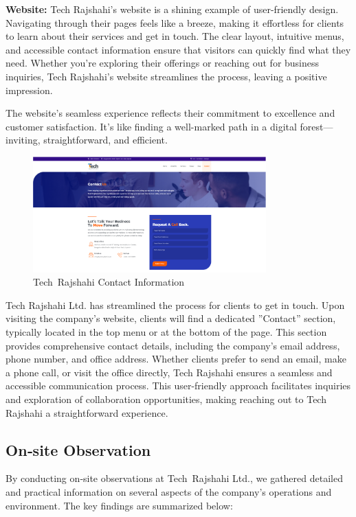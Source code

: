 \documentclass[12pt,a4paper]{article}
\begin{document}
\textbf{Website:} Tech Rajshahi’s website is a shining example of user-friendly design. Navigating through their pages feels like a breeze, making it effortless for clients to learn about their services and get in touch. The clear layout, intuitive menus, and accessible contact information ensure that visitors can quickly find what they need. Whether you’re exploring their offerings or reaching out for business inquiries, Tech Rajshahi’s website streamlines the process, leaving a positive impression. 

The website’s seamless experience reflects their commitment to excellence and customer satisfaction. It’s like finding a well-marked path in a digital forest—inviting, straightforward, and efficient.

\begin{figure}[H]
    \centering
    \includegraphics[width=0.8\textwidth]{Fig/tech_contact.png}
    \caption{Tech Rajshahi Contact Information}
    \label{fig:tech_contact}
\end{figure}

Tech Rajshahi Ltd. has streamlined the process for clients to get in touch. Upon visiting the
company’s website, clients will find a dedicated ”Contact” section, typically located in the top
menu or at the bottom of the page. This section provides comprehensive contact details, including
the company’s email address, phone number, and office address. Whether clients prefer to send
an email, make a phone call, or visit the office directly, Tech Rajshahi ensures a seamless and
accessible communication process. This user-friendly approach facilitates inquiries and exploration
of collaboration opportunities, making reaching out to Tech Rajshahi a straightforward experience.

\subsection{On‑site Observation}
By conducting on‑site observations at Tech Rajshahi Ltd., we gathered detailed and practical information on several aspects of the company’s operations and environment.  The key findings are summarized below:
\end{document}
